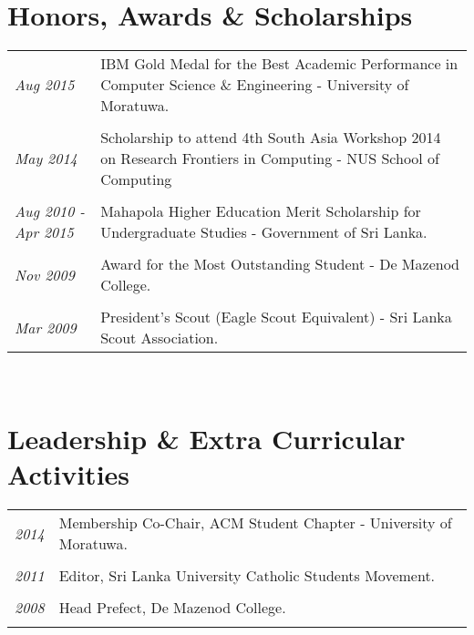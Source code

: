 \documentclass[a4paper,10pt]{article}
\begin{document}
\section{Honors, Awards \& Scholarships}
\begin{tabular}{p{3cm}|p{13.5cm}}
\emph{Aug 2015} & IBM Gold Medal for the Best Academic Performance in Computer Science \& Engineering - University of Moratuwa.\\\\
\emph{May 2014} & Scholarship to attend 4th South Asia Workshop 2014 on Research Frontiers in Computing - NUS School of Computing\\\\
\emph{Aug 2010 - Apr 2015} & Mahapola Higher Education Merit Scholarship for Undergraduate Studies - Government of Sri Lanka.\\\\
\emph{Nov 2009} & Award for the Most Outstanding Student - De Mazenod College.\\\\
\emph{Mar 2009} & President’s Scout (Eagle Scout Equivalent) - Sri Lanka Scout Association.\\
\end{tabular}\\

\section{Leadership \& Extra Curricular Activities}
\begin{tabular}{p{3cm}|p{13.5cm}}
\emph{2014} & Membership Co-Chair, ACM Student Chapter - University of Moratuwa.\\\\

\emph{2011} & Editor, Sri Lanka University Catholic Students Movement.\\\\
\emph{2008} & Head Prefect, De Mazenod College.\\\\
\end{tabular}
\end{document}
